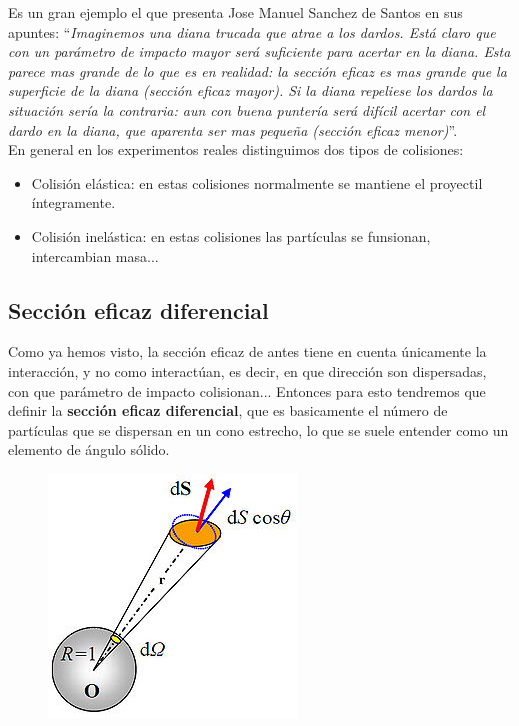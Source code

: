 \documentclass[12pt,a4paper]{book}
\begin{document}
Es un gran ejemplo el que presenta Jose Manuel Sanchez de Santos en sus apuntes: ``\textit{Imaginemos una diana trucada que atrae a los dardos. Está claro que con un parámetro de impacto mayor será suficiente para acertar en la diana. Esta parece mas grande de lo que es en realidad: la sección eficaz es mas grande que la superficie de la diana (sección eficaz mayor). Si la diana repeliese los dardos la situación sería la contraria: aun con buena puntería será difícil acertar con el dardo en la diana, que aparenta ser mas pequeña (sección eficaz menor)}''. \\

En general en los experimentos reales distinguimos dos tipos de colisiones:

\begin{itemize}
\item Colisión elástica: en estas colisiones normalmente se mantiene el proyectil íntegramente.
\item Colisión inelástica: en estas colisiones las partículas se funsionan, intercambian masa...
\end{itemize}

\subsection{Sección eficaz diferencial}


Como ya hemos visto, la sección eficaz de antes tiene en cuenta únicamente la interacción, y no como interactúan, es decir, en que dirección son dispersadas, con que parámetro de impacto colisionan...  Entonces para esto tendremos que definir la \textbf{sección eficaz diferencial}, que es basicamente el número de partículas que se dispersan en un cono estrecho, lo que se suele entender como un elemento de ángulo sólido. \\

\begin{figure}[h!] \centering
\includegraphics[scale=1]{angulosolido.jpg}
\end{figure}
\end{document}
